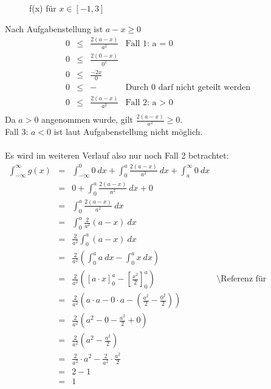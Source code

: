 \documentclass[twoside]{article}
\begin{document}
\begin{figure}
\caption{f(x) für $x\in[-1,3]$}
\label{12.2.a}
\end{figure}
\sss
Nach Aufgabenstellung ist $a-x\geq0$
\[
    \begin{array}{rll|l}
        0&\leq&\frac{2(a-x)}{a^2}&\text{Fall 1: a = 0}\\
        0&\leq&\frac{2(0-x)}{0^2}&\\
        0&\leq&\frac{-2x}{0}&\\
        0&\leq&-&\text{Durch 0 darf nicht geteilt werden}\\
        0&\leq&\frac{2(a-x)}{a^2}&\text{Fall 2: a > 0}\\
    \end{array}
\]
Da $a>0$ angenommen wurde, gilt $\frac{2(a-x)}{a^2}\geq0$.\\
Fall 3: $a<0$ ist laut Aufgabenstellung nicht möglich.\\
\\
Es wird im weiteren Verlauf also nur noch Fall 2 betrachtet:\\
\[
    \begin{array}{rlll}
        \int_{-\infty}^{\infty}g(x)&=&\int_{-\infty}^{0}0~dx+\int_{0}^{a}\frac{2(a-x)}{a^2}~dx+\int_{a}^{\infty}0~dx&\\
        &=&0+\int_{0}^{a}\frac{2(a-x)}{a^2}~dx+0&\\
        &=&\int_{0}^{a}\frac{2(a-x)}{a^2}~dx&\\
        &=&\int_{0}^{a}\frac{2}{a^2}(a-x)~dx&\\
        &=&\frac{2}{a^2}\int_{0}^{a}(a-x)~dx&\\
        &=&\frac{2}{a^2}\left(\int_{0}^{a}a~dx-\int_{0}^{a}x~dx\right)&\\
        &=&\frac{2}{a^2}\left([a\cdot x]_{0}^{a}-[\frac{x^2}{2}]_{0}^{a}\right)&\text{\textbackslash Referenz für Aufgabenteil 2}\\
        &=&\frac{2}{a^2}\left(a\cdot a-0\cdot a-(\frac{a^2}{2}-\frac{0^2}{2})\right)&\\
        &=&\frac{2}{a^2}\left(a^2-0-\frac{a^2}{2}+0\right)&\\
        &=&\frac{2}{a^2}\left(a^2-\frac{a^2}{2}\right)&\\
        &=&\frac{2}{a^2}\cdot a^2-\frac{2}{a^2}\cdot\frac{a^2}{2}&\\
        &=&2-1&\\
        &=&1
    \end{array}
\]
\end{document}
